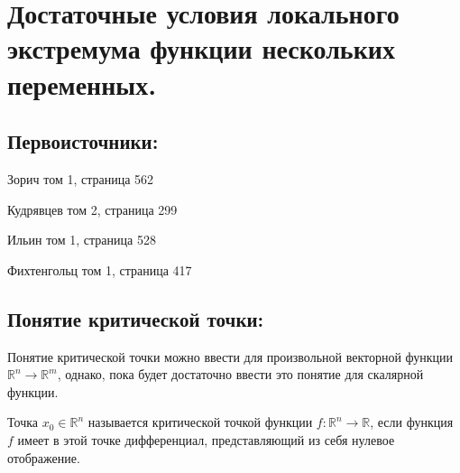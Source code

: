 


\section{Достаточные условия локального экстремума функции нескольких переменных.}
\subsection{Первоисточники:}
\parindent=0cm
Зорич том 1, страница 562

Кудрявцев том 2, страница 299

Ильин том 1, страница 528

Фихтенгольц том 1, страница 417

\subsection{Понятие критической точки:}

Понятие критической точки можно ввести для произвольной векторной функции $\mathbb{R}^n \to \mathbb{R}^m$, однако, пока будет достаточно ввести это понятие для скалярной функции. 

\begin{definition}
Точка $x_0 \in \mathbb{R}^n$ называется критической точкой функции $f: \mathbb{R}^n \to \mathbb{R}$, если функция $f$ имеет в этой точке дифференциал, представляющий из себя нулевое отображение.
\end{definition}
